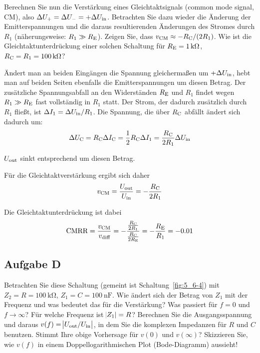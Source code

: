 \begin{problem}
    Berechnen Sie nun die Verstärkung eines Gleichtaktsignals (common mode
    signal, CM), also $\Delta U_+ = \Delta U_- = +\Delta \Uin$. Betrachten Sie
    dazu wieder die Änderung der Emitterspannungen und die daraus
    resultierenden Änderungen des Stromes durch $R_1$ (näherungsweise: $R_1 \gg
    \RE$). Zeigen Sie, dass $v_\text{CM} \approx -\RC / (2R_1)$. Wie ist die
    Gleichtaktunterdrückung einer solchen Schaltung für $\RE = \SI
    1{\kilo\ohm}$, $\RC = R_1 = \SI{100}{\kilo\ohm}$?
\end{problem}

Ändert man an beiden Eingängen die Spannung gleichermaßen um $+\Delta\Uin$,
hebt man auf beiden Seiten ebenfalls die Emitterspannungen um diesen Betrag.
Der zusätzliche Spannungsabfall an den Widerständen $\RE$ und $R_1$ findet
wegen $R_1 \gg \RE$ fast vollständig in $R_1$ statt. Der Strom, der dadurch
zusätzlich durch $R_1$ fließt, ist $\Delta I_1 = \Delta\Uin / R_1$. Die
Spannung, die über $\RC$ abfällt ändert sich dadurch um:
\[
    \Delta\UC = \RC\Delta\IC = \half\RC\Delta I_1 = \frac \RC {2R_1} \Delta\Uin
\]

$\Uout$ sinkt entsprechend um diesen Betrag.

Für die Gleichtaktverstärkung ergibt sich daher 
\[
    v_\text{CM} = \frac{\Uout}{\Uin} = -\frac \RC {2R_1}
\]

Die Gleichtaktunterdrückung ist dabei
\[
    \text{CMRR} = \frac {v_\text{CM}}{v_\text{diff}} = -\frac
    {\frac{\RC}{2R_1}}{\frac{\RC}{2\RE}} = -\frac{\RE}{R_1} = -0.01
\]

\FloatBarrier
\subsection{Aufgabe D}

\begin{problem}
    Betrachten Sie diese Schaltung (gemeint ist Schaltung~\ref{fig:5_6-4}) mit
    $Z_2 = R = \SI {100}{\kilo\ohm}$, $Z_1 = C = \SI {100}{\nano\farad}$. Wie
    ändert sich der Betrag von $Z_1$ mit der Frequenz und was bedeutet das für
    die Verstärkung? Was passiert für $f = 0$ und $f \to \infty$? Für welche
    Frequenz ist $\abs{Z_1} = R$? Berechnen Sie die Ausgangsspannung und
    daraus $v(f) = \abs{\Uout / \Uin}$, in dem Sie die komplexen Impedanzen für
    $R$ und $C$ benutzen. Stimmt Ihre obige Vorhersage für $v(0)$ und
    $v(\infty)$? Skizzieren Sie, wie $v(f)$ in einem Doppellogarithmischen Plot
    (Bode-Diagramm) aussieht!
\end{problem}

